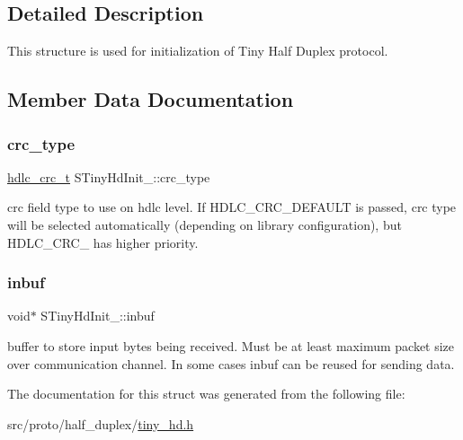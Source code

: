 \subsection{Detailed Description}
This structure is used for initialization of Tiny Half Duplex protocol. 

\subsection{Member Data Documentation}
\mbox{\label{structSTinyHdInit___a520f9fbb19f5ec84f3f86a10d819faf4}} 
\subsubsection{\texorpdfstring{crc\+\_\+type}{crc\_type}}
{\footnotesize\ttfamily \hyperlink{group__HDLC__API_gabb73b32d08d8e79eefe9385634a74bf7}{hdlc\+\_\+crc\+\_\+t} S\+Tiny\+Hd\+Init\+\_\+\+::crc\+\_\+type}

crc field type to use on hdlc level. If H\+D\+L\+C\+\_\+\+C\+R\+C\+\_\+\+D\+E\+F\+A\+U\+LT is passed, crc type will be selected automatically (depending on library configuration), but H\+D\+L\+C\+\_\+\+C\+R\+C\+\_ has higher priority. \mbox{\label{structSTinyHdInit___a5996a48606a90ff9938e4037612cf97d}} 
\subsubsection{\texorpdfstring{inbuf}{inbuf}}
{\footnotesize\ttfamily void$\ast$ S\+Tiny\+Hd\+Init\+\_\+\+::inbuf}

buffer to store input bytes being received. Must be at least maximum packet size over communication channel. In some cases inbuf can be reused for sending data. 

The documentation for this struct was generated from the following file\+:\begin{DoxyCompactItemize}
\item 
src/proto/half\+\_\+duplex/\hyperlink{tiny__hd_8h}{tiny\+\_\+hd.\+h}\end{DoxyCompactItemize}
